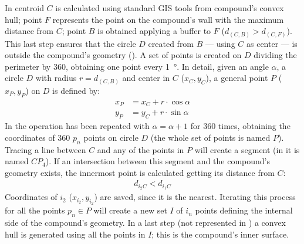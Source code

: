             In  centroid $C$ is calculated using standard GIS tools from compound's convex hull; point $F$ represents the point on the compound's wall with the maximum distance from $C$; point $B$ is obtained applying a buffer to $F$ ($d_{(C,B)} > d_{(C,F)}$). This last step ensures that the circle $D$ created from $B$ --- using $C$ as center --- is outside the compound's geometry (). A set of points is created on $D$ dividing the perimeter by 360, obtaining one point every \SI{1}{\degree}. In detail, given an angle $\alpha$, a circle $D$ with radius $r=d_{(C,B)}$ and center in $C$ ($x_C, y_C$), a general point $P$ ($x_P, y_P$) on $D$ is defined by:
            \begin{align}
                \label{eq:point-circle}
                x_P &= x_C + r\cdot\cos\alpha\\
                y_P &= y_C + r\cdot\sin\alpha
            \end{align}
            In  the operation has been repeated with $\alpha=\alpha+1$ for 360 times, obtaining the coordinates of 360 $p_n$ points on circle $D$ (the whole set of points is named $P$). Tracing a line between $C$ and any of the points in $P$ will create a segment (in  it is named $CP_4$). If an intersection between this segment and the compound's geometry exists, the innermost point is calculated getting its distance from $C$:
            \begin{align}
                \label{eq:innerpoint}
                d_{i_2 C} < d_{i_1 C}
            \end{align}
            Coordinates of $i_2$ ($x_{i_2}, y_{i_2}$) are saved, since it is the nearest. Iterating this process for all the points $p_n\in P$ will create a new set $I$ of $i_n$ points defining the internal side of the compound's geometry. In a last step (not represented in ) a convex hull is generated using all the points in $I$; this is the compound's inner surface.


